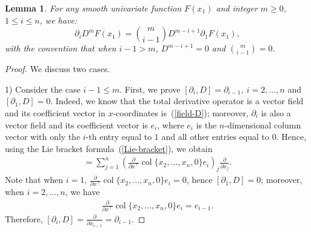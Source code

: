 \documentclass[11pt]{article}
\newtheorem{lemma}{Lemma}
\DeclareMathOperator{\col}{col}
\begin{document}
\begin{lemma}\label{lem-D}
	For any smooth univariate function $F(x_1)$ and integer $m \geq 0$, $1 \leq i \leq n$, we have:
	\begin{equation}\label{eq:op_deriv}
		\partial_i D^m F(x_1) = \binom{m}{i-1} D^{m-i+1} \partial_1F(x_1),
	\end{equation}
	with the convention that when $i-1 > m$, $D^{m-i+1}=0$ and $\binom{m}{i-1} = 0$.
\end{lemma}
\begin{proof}
	We discuss two cases.
	
	1) Consider the case $i-1\leq m$. First, we prove $[\partial_i,D]=\partial_{i-1},~i=2,\ldots,n$ and $[\partial_1,D]=0$. Indeed, we know that the total derivative operator is a vector field and its coefficient vector in $x$-coordinates is~(\ref{field-D}); moreover, $\partial_i$ is also a vector field and its coefficient vector is $e_i$, where $e_i$ is the $n$-dimensional column vector with only the $i$-th entry equal to $1$ and all other entries equal to $0$. Hence, using the Lie bracket formula~(\ref{Lie-bracket}), we obtain
	\begin{align}
		[\partial_i,D]=\sum_{j=1}^n\left(\frac{\partial}{\partial x^\top}\col\{x_2,\ldots,x_n,0\}e_i\right)_j\frac{\partial}{\partial x_j}.
	\end{align}
	Note that when $i=1$, $\frac{\partial}{\partial x^\top}\col\{x_2,\ldots,x_n,0\}e_i=0$, hence $[\partial_1,D]=0$; moreover, when $i=2,\ldots,n$, we have
	\begin{align}
		\frac{\partial}{\partial x^\top}\col\{x_2,\ldots,x_n,0\}e_i=e_{i-1}.
	\end{align}
	Therefore, $[\partial_i,D]=\frac{\partial}{\partial x_{i-1}}=\partial_{i-1}$.
	

\end{proof}
\end{document}
